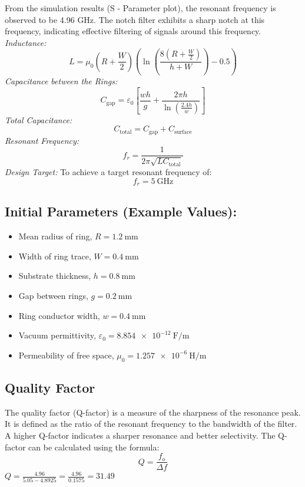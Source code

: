 \documentclass[conference]{IEEEtran}
\begin{document}
From the simulation results (S - Parameter plot), the resonant frequency is observed to be 4.96 GHz. The notch filter exhibits a sharp notch at this frequency, indicating effective filtering of signals around this frequency.
\textit{Inductance:}\\
\begin{equation}
L = \mu_0 \left( R + \frac{W}{2} \right) \left( \ln \left( \frac{8 \left( R + \frac{W}{2} \right)}{h + W} \right) - 0.5 \right)
\end{equation}
\textit{Capacitance between the Rings:}
\begin{equation}
C_{\text{gap}} = \varepsilon_0 \left[ \frac{wh}{g} + \frac{2\pi h}{\ln\left(\frac{2.4h}{w}\right)} \right]
\end{equation}
\textit{Total Capacitance:}
\begin{equation}
C_{\text{total}} = C_{\text{gap}} + C_{\text{surface}}
\end{equation}
\textit{Resonant Frequency:}
\begin{equation}
f_r = \frac{1}{2\pi \sqrt{L C_{\text{total}}}}
\end{equation}
\textit{Design Target:}
To achieve a target resonant frequency of:
\[
f_r = \SI{5}{\giga\hertz}
\]
\subsection*{Initial Parameters (Example Values):}
\begin{itemize}
    \item Mean radius of ring, \( R = \SI{1.2}{\milli\meter} \)
    \item Width of ring trace, \( W = \SI{0.4}{\milli\meter} \)
    \item Substrate thickness, \( h = \SI{0.8}{\milli\meter} \)
    \item Gap between rings, \( g = \SI{0.2}{\milli\meter} \)
    \item Ring conductor width, \( w = \SI{0.4}{\milli\meter} \)
    \item Vacuum permittivity, \( \varepsilon_0 = \SI{8.854e-12}{\farad\per\meter} \)
    \item Permeability of free space, \( \mu_0 = \SI{1.257e-6}{\henry\per\meter} \)
\end{itemize}

\subsection{Quality Factor}
The quality factor (Q-factor) is a measure of the sharpness of the resonance peak. It is defined as the ratio of the resonant frequency to the bandwidth of the filter. A higher Q-factor indicates a sharper resonance and better selectivity. The Q-factor can be calculated using the formula:
\begin{equation}        
    Q = \frac{f_o}{\Delta f}
\end{equation}
$Q = \frac{4.96}{5.05-4.8925} = \frac{4.96}{0.1575} = 31.49$
\end{document}
